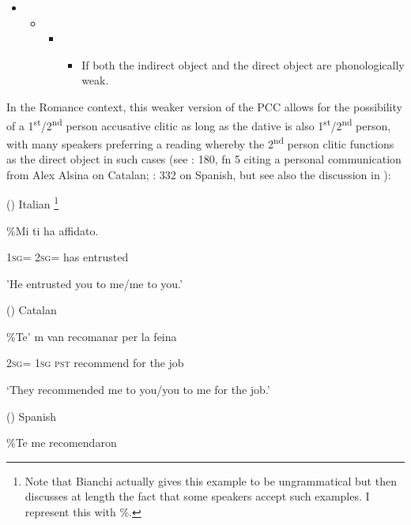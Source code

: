 \documentclass[output=paper,modfonts,nonflat]{langsci/langscibook}
\begin{document}
\begin{itemize}
\item \begin{itemize}
\item \begin{itemize}
\item \begin{itemize}
\item \begin{styleListParagraph}
If both the indirect object and the direct object are phonologically weak. 
\end{styleListParagraph}
\end{itemize}
\end{itemize}
\end{itemize}
\end{itemize}

In the Romance context, this weaker version of the PCC allows for the possibility of a 1\textsuperscript{st}/2\textsuperscript{nd} person accusative clitic as long as the dative is also 1\textsuperscript{st}/2\textsuperscript{nd} person, with many speakers preferring a reading whereby the 2\textsuperscript{nd} person clitic functions as the direct object in such cases (see \citealt{Bonet1991}: 180, fn 5 citing a personal communication from Alex Alsina on Catalan; \citealt{OrmazabalRomero2010}: 332 on Spanish, but see also the discussion in \citealt{Bonet2007}):

()  Italian \citep[2027]{Bianchi2006}\textstyleFootnoteSymbol{} \footnote{Note that Bianchi actually gives this example to be ungrammatical but then discusses at length the fact that some speakers accept such examples. I represent this with \%.}

\%Mi   ti     ha   affidato. 

  \textsc{1sg=}   \textsc{2sg=}   has   entrusted

  {}'He entrusted you to me/me to you.’

()  Catalan \citep[179]{Bonet1991}

\%Te’  m   van   recomanar   per   la   feina

  \textsc{2sg=}  \textsc{1sg}   \textsc{pst}   recommend   for   the   job

‘They recommended me to you/you to me for the job.’

()  Spanish \citep[61]{Perlmutter1971}

\%Te   me   recomendaron  
\end{document}
